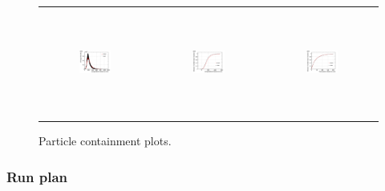 \begin{figure}[htp]
\begin{tabular}{ccc}
   \includegraphics[width=0.31\textwidth,height=3.5cm]{figures/pions_density_overlay}&
   \includegraphics[width=0.31\textwidth,height=3.5cm]{figures/pions_lcont_overlay}&
   \includegraphics[width=0.31\textwidth,height=3.5cm]{figures/pions_wcont_overlay}\\
 
% 
 
  \end{tabular}
  \caption{Particle containment plots.}
\end{figure}

\clearpage
\subsubsection {Run plan}

